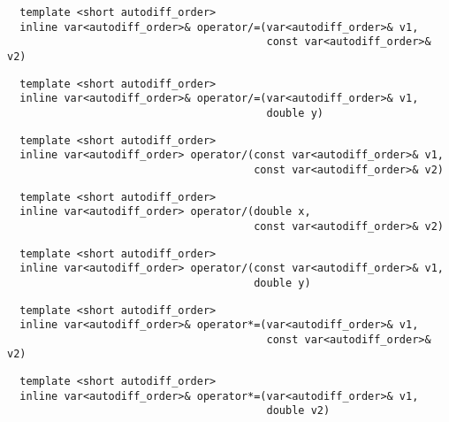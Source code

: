 \begin{tcolorbox}[colback=white,colframe=gray90, coltitle=black,boxrule=3pt,
fonttitle=\bfseries,title=Operator Division Assignment]

\begin{verbatim}
  template <short autodiff_order>
  inline var<autodiff_order>& operator/=(var<autodiff_order>& v1,
                                         const var<autodiff_order>& v2)
\end{verbatim}

\begin{verbatim}
  template <short autodiff_order>
  inline var<autodiff_order>& operator/=(var<autodiff_order>& v1,
                                         double y)
\end{verbatim}

\end{tcolorbox}

\begin{tcolorbox}[colback=white,colframe=gray90, coltitle=black,boxrule=3pt,
fonttitle=\bfseries,title=Operator Division]

\begin{verbatim}
  template <short autodiff_order>
  inline var<autodiff_order> operator/(const var<autodiff_order>& v1,
                                       const var<autodiff_order>& v2)
\end{verbatim}

\begin{verbatim}
  template <short autodiff_order>
  inline var<autodiff_order> operator/(double x,
                                       const var<autodiff_order>& v2)
\end{verbatim}

\begin{verbatim}
  template <short autodiff_order>
  inline var<autodiff_order> operator/(const var<autodiff_order>& v1,
                                       double y)
\end{verbatim}

\end{tcolorbox}

\begin{tcolorbox}[colback=white,colframe=gray90, coltitle=black,boxrule=3pt,
fonttitle=\bfseries,title=Operator Multiplication]

\begin{verbatim}
  template <short autodiff_order>
  inline var<autodiff_order>& operator*=(var<autodiff_order>& v1,
                                         const var<autodiff_order>& v2)
\end{verbatim}

\begin{verbatim}
  template <short autodiff_order>
  inline var<autodiff_order>& operator*=(var<autodiff_order>& v1,
                                         double v2)
\end{verbatim}

\end{tcolorbox}

